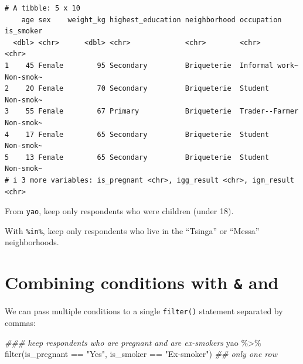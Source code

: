 \documentclass[
  letterpaper,
  DIV=11,
  numbers=noendperiod]{scrreprt}
\newenvironment{Shaded}{\begin{snugshade}}{\end{snugshade}}
\newcommand{\DocumentationTok}[1]{\textcolor[rgb]{0.37,0.37,0.37}{\textit{#1}}}
\newcommand{\FunctionTok}[1]{\textcolor[rgb]{0.28,0.35,0.67}{#1}}
\newcommand{\NormalTok}[1]{\textcolor[rgb]{0.00,0.23,0.31}{#1}}
\newcommand{\SpecialCharTok}[1]{\textcolor[rgb]{0.37,0.37,0.37}{#1}}
\newcommand{\StringTok}[1]{\textcolor[rgb]{0.13,0.47,0.30}{#1}}
\begin{document}
\begin{verbatim}
# A tibble: 5 x 10
    age sex    weight_kg highest_education neighborhood occupation     is_smoker
  <dbl> <chr>      <dbl> <chr>             <chr>        <chr>          <chr>    
1    45 Female        95 Secondary         Briqueterie  Informal work~ Non-smok~
2    20 Female        70 Secondary         Briqueterie  Student        Non-smok~
3    55 Female        67 Primary           Briqueterie  Trader--Farmer Non-smok~
4    17 Female        65 Secondary         Briqueterie  Student        Non-smok~
5    13 Female        65 Secondary         Briqueterie  Student        Non-smok~
# i 3 more variables: is_pregnant <chr>, igg_result <chr>, igm_result <chr>
\end{verbatim}

\begin{tcolorbox}[enhanced jigsaw, colframe=quarto-callout-tip-color-frame, rightrule=.15mm, opacityback=0, breakable, coltitle=black, colbacktitle=quarto-callout-tip-color!10!white, bottomrule=.15mm, leftrule=.75mm, toprule=.15mm, arc=.35mm, bottomtitle=1mm, colback=white, left=2mm, opacitybacktitle=0.6, titlerule=0mm, title=\textcolor{quarto-callout-tip-color}{\faLightbulb}\hspace{0.5em}{Practice}, toptitle=1mm]

From \texttt{yao}, keep only respondents who were children (under 18).

With \texttt{\%in\%}, keep only respondents who live in the ``Tsinga''
or ``Messa'' neighborhoods.

\end{tcolorbox}

\hypertarget{combining-conditions-with-and}{%
\section{\texorpdfstring{Combining conditions with \texttt{\&} and
\texttt{\textbar{}}}{Combining conditions with \& and \textbar{}}}\label{combining-conditions-with-and}}

We can pass multiple conditions to a single \texttt{filter()} statement
separated by commas:

\begin{Shaded}
\begin{Highlighting}[]
\DocumentationTok{\#\#\# keep respondents who are pregnant and are ex{-}smokers}
\NormalTok{yao }\SpecialCharTok{\%\textgreater{}\%} \FunctionTok{filter}\NormalTok{(is\_pregnant }\SpecialCharTok{==} \StringTok{"Yes"}\NormalTok{, is\_smoker }\SpecialCharTok{==} \StringTok{"Ex{-}smoker"}\NormalTok{) }\DocumentationTok{\#\# only one row}
\end{Highlighting}
\end{Shaded}
\end{document}

